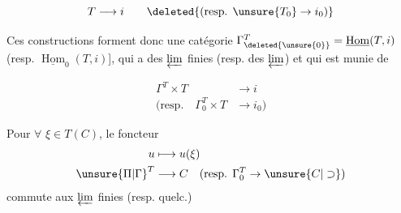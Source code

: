 \[T\longrightarrow i\qquad\deleted{(\text{resp. }\unsure{T_0}\to i_0)}\]

Ces constructions  forment donc une catégorie $\Gamma^T_{\deleted{\unsure{0}}}=\underline{\operatorname{Hom}}(T,i)$ (resp. $\underline{\operatorname{Hom}}_0(T,i)$], qui a des $\varprojlim$ finies (resp. des $\varprojlim$) et qui est munie de

\[\begin{aligned}\Gamma^T\times T&\longrightarrow i\\(\text{resp.}\quad\Gamma_0^T\times T&\longrightarrow i_0)\end{aligned}\]

Pour $\forall$  $\xi\in T(C)$, le foncteur
\[\begin{aligned}u&\longmapsto u(\xi)\\{\unsure{\Pi|\Gamma}}^{T}&\longrightarrow C\quad(\text{resp. }\Gamma_0^{T}\to \unsure{C|\supset})\end{aligned}\]
commute aux $\varprojlim$ finies  (resp. quelc.)

